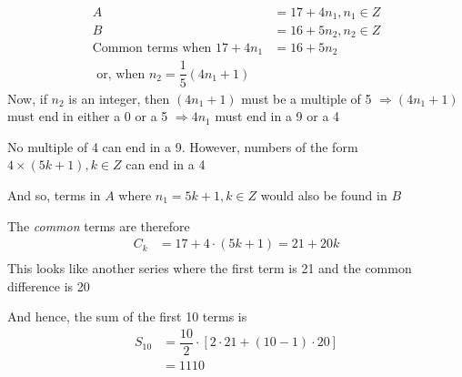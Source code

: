 \begin{solution}[\halfpage]
  \begin{align}
  	A &= 17 + 4n_1, n_1 \in Z\\
  	B &= 16 + 5n_2, n_2 \in Z \\
  	\text{Common terms when } 17+4n_1 &= 16+5n_2 \\ 
  	\text{ or, when } n_2 = \dfrac{1}{5}(4n_1 + 1)
  \end{align}
  Now, if $n_2$ is an integer, then $(4n_1+1)$ must be a multiple of 5 $\Rightarrow (4n_1+1)$
  must end in either a 0 or a 5 $\Rightarrow 4n_1$ must end in a 9 or a 4
  
  No multiple of 4 can end in a 9. However, numbers of the form $4\times (5k+1), k \in Z$
  can end in a 4
  
  And so, terms in $A$ where $n_1 = 5k+1, k \in Z$ would also be found in $B$
  
  The \textit{common} terms are therefore
  \begin{align}
  	C_k &= 17 + 4\cdot(5k + 1) = 21 + 20k \\
  \end{align}
  This looks like another series where the first term is 21 and the common difference is 20
  
  And hence, the sum of the first 10 terms is
  \begin{align}
  	S_{10} &= \dfrac{10}{2}\cdot\left[ 2\cdot 21 + (10-1)\cdot 20 \right] \\
  	       &= 1110
  \end{align}
\end{solution} 
